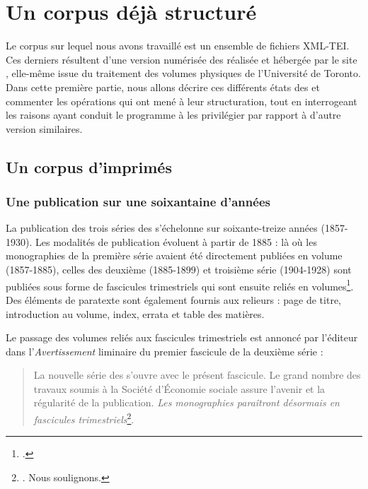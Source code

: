 \part{Un corpus déjà structuré}

\clearpage
\thispagestyle{empty}
\cleardoublepage
{}
Le corpus sur lequel nous avons travaillé est un ensemble de fichiers XML-TEI. Ces derniers résultent d'une version numérisée des \odm{} réalisée et hébergée par le site \ia, elle-même issue du traitement des volumes physiques de l'Université de Toronto. Dans cette première partie, nous allons décrire ces différents états des \odm{} et commenter les opérations qui ont mené à leur structuration, tout en interrogeant les raisons ayant conduit le programme \timeus{} à les privilégier par rapport à d'autre version similaires.

\chapter{Un corpus d'imprimés}

\section{Une publication sur une soixantaine d'années}

La publication des trois séries des \odm{} s'échelonne sur soixante-treize années (1857-1930). Les modalités de publication évoluent à partir de 1885  : là  où les monographies de la première série avaient été directement publiées en volume (1857-1885), celles des deuxième (1885-1899) et troisième série (1904-1928) sont publiées sous forme de fascicules trimestriels qui sont ensuite reliés en volumes\footnote{\cite[p. 124]{lorry}.}. Des éléments de paratexte sont également fournis aux relieurs : page de titre, introduction au volume, index, errata et table des matières.

Le passage des volumes reliés aux fascicules trimestriels est annoncé par l'éditeur dans l'\textit{Avertissement} liminaire du premier fascicule de la deuxième série :

\begin{quote}
    \og La nouvelle série des \odm{} s'ouvre avec 
le présent fascicule. Le grand nombre des travaux soumis à la 
Société d'Économie sociale assure l'avenir et la régularité 
de la publication. \textit{Les monographies paraîtront désormais en 
fascicules trimestriels}\footnote{\cite[\og Avertissement \fg{}, p. I]{mono047a}. Nous soulignons.}. \fg{}
\end{quote}

